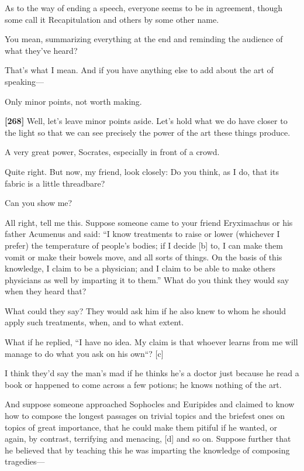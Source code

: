 As to the way of ending a speech, everyone seems to be in agreement,
though some call it Recapitulation and others by some other name.

\sayphaedrus You mean, summarizing everything at the end and reminding the
audience of what they've heard?

\saysocrates That's what I mean. And if you have anything else to add about
the art of speaking---

\sayphaedrus Only minor points, not worth making.

{\bf {[}268{]}} \saysocrates Well, let's leave minor points aside. Let's
hold what we do have closer to the light so that we can see precisely
the power of the art these things produce.

\sayphaedrus A very great power, Socrates, especially in front of a crowd.

\saysocrates Quite right. But now, my friend, look closely: Do you think,
as I do, that its fabric is a little threadbare?

\sayphaedrus Can you show me?

\saysocrates All right, tell me this. Suppose someone came to your friend
Eryximachus or his father Acumenus and said: “I know treatments to raise
or lower (whichever I prefer) the temperature of people's bodies; if I
decide {[}b{]} to, I can make them vomit or make their bowels move, and
all sorts of things. On the basis of this knowledge, I claim to be a
physician; and I claim to be able to make others physicians as well by
imparting it to them.” What do you think they would say when they heard
that?

\sayphaedrus What could they say? They would ask him if he also knew to
whom he should apply such treatments, when, and to what extent.

\saysocrates What if he replied, “I have no idea. My claim is that whoever
learns from me will manage to do what you ask on his own“? {[}c{]}

\sayphaedrus I think they'd say the man's mad if he thinks he's a doctor
just because he read a book or happened to come across a few potions; he
knows nothing of the art.

\saysocrates And suppose someone approached Sophocles and Euripides and
claimed to know how to compose the longest passages on trivial topics
and the briefest ones on topics of great importance, that he could make
them pitiful if he wanted, or again, by contrast, terrifying and
menacing, {[}d{]} and so on. Suppose further that he believed that by
teaching this he was imparting the knowledge of composing tragedies---

